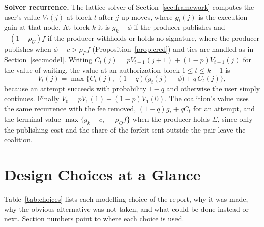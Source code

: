 \documentclass[11pt]{article}
\begin{document}
\textbf{Solver recurrence.} The lattice solver of Section~\ref{sec:framework} computes the user's value $V_t(j)$ at block $t$ after $j$ up-moves, where $g_t(j)$ is the execution gain at that node. At block $k$ it is $g_k-\phi$ if the producer publishes and $-(1-\rho_U)f$ if the producer withholds or holds no signature, where the producer publishes when $\phi-c>\rho_P f$ (Proposition~\ref{prop:cred}) and ties are handled as in Section~\ref{sec:model}. Writing $C_t(j)=pV_{t+1}(j+1)+(1-p)V_{t+1}(j)$ for the value of waiting, the value at an authorization block $1\le t\le k-1$ is
\[V_t(j)=\max\big\{C_t(j),\ (1-q)\big(g_t(j)-\phi\big)+q\,C_t(j)\big\},\]
because an attempt succeeds with probability $1-q$ and otherwise the user simply continues. Finally $V_0=pV_1(1)+(1-p)V_1(0)$. The coalition's value uses the same recurrence with the fee removed, $(1-q)g_t+qC_t$ for an attempt, and the terminal value $\max\{g_k-c,\,-\rho_O f\}$ when the producer holds $\Sigma$, since only the publishing cost and the share of the forfeit sent outside the pair leave the coalition.

\section{Design Choices at a Glance}\label{app:choices}
Table~\ref{tab:choices} lists each modelling choice of the report, why it was made, why the obvious alternative was not taken, and what could be done instead or next. Section numbers point to where each choice is used.
\end{document}
